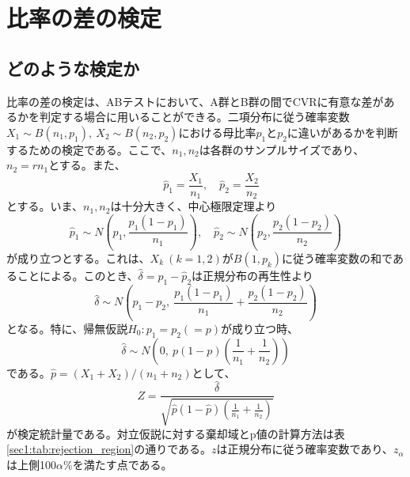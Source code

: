 \section{比率の差の検定}

\subsection{どのような検定か}

比率の差の検定は、ABテストにおいて、A群とB群の間でCVRに有意な差があるかを判定する場合に用いることができる。二項分布に従う確率変数$X_{1} \sim B(n_{1}, p_{1}),\ X_{2} \sim B(n_{2}, p_{2})$における母比率$p_{1}$と$p_{2}$に違いがあるかを判断するための検定である。ここで、$n_{1}, n_{2}$は各群のサンプルサイズであり、$n_{2} = rn_{1}$とする。また、
\begin{equation}
    \quad \hat{p}_{1} = \frac{X_{1}}{n_{1}}, \quad \hat{p}_{2} = \frac{X_{2}}{n_{2}}
\end{equation}
とする。いま、$n_{1}, n_{2}$は十分大きく、中心極限定理より
\begin{equation}
    \hat{p}_{1} \sim N\left(p_{1}, \frac{p_{1}(1 - p_{1})}{n_{1}}\right), \quad \hat{p}_{2} \sim N\left(p_{2}, \frac{p_{2}(1 - p_{2})}{n_{2}}\right)
\end{equation}
が成り立つとする。これは、$X_{k}\ (k = 1, 2)$が$B(1, p_{k})$に従う確率変数の和であることによる。このとき、$\hat{\delta} = \hat{p}_{1} - \hat{p}_{2}$は正規分布の再生性より
\begin{equation}
    \hat{\delta} \sim N\left(p_{1} - p_{2},\ \frac{p_{1}(1 - p_{1})}{n_{1}} + \frac{p_{2}(1 - p_{2})}{n_{2}}\right)
\end{equation}
となる。特に、帰無仮説$H_{0}: p_{1} = p_{2} (= p)$が成り立つ時、
\begin{equation}
    \hat{\delta} \sim N\left(0,\ p(1 - p)\left(\frac{1}{n_{1}} + \frac{1}{n_{2}}\right)\right)
\end{equation}
である。$\hat{p} = (X_{1} + X_{2}) / (n_{1} + n_{2})$として、
\begin{equation}
    Z = \frac{\hat{\delta}}{\sqrt{\hat{p}(1 - \hat{p})\left(\frac{1}{n_{1}} + \frac{1}{n_{2}}\right)}}
\end{equation}
が検定統計量である。対立仮説に対する棄却域とp値の計算方法は表\ref{sec1:tab:rejection_region}の通りである。$z$は正規分布に従う確率変数であり、$z_{\alpha}$は上側100$\alpha$\%を満たす点である。

